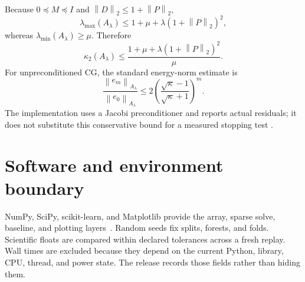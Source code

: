 \documentclass[10pt,letterpaper,twoside]{article}
\newcommand{\norm}[1]{\left\lVert #1\right\rVert}
\begin{document}
Because $0\preceq M\preceq I$ and
$\norm{D}_2\le1+\norm{P}_2$,
\begin{equation}
 \lambda_{\max}(A_\lambda)
 \le1+\mu+\lambda(1+\norm{P}_2)^2,
\end{equation}
whereas $\lambda_{\min}(A_\lambda)\ge\mu$.  Therefore
\begin{equation}
 \kappa_2(A_\lambda)\le
 \frac{1+\mu+\lambda(1+\norm{P}_2)^2}{\mu}.
\end{equation}
For unpreconditioned CG, the standard energy-norm estimate is
\begin{equation}
 \frac{\norm{e_m}_{A_\lambda}}{\norm{e_0}_{A_\lambda}}
 \le2\left(\frac{\sqrt\kappa-1}{\sqrt\kappa+1}\right)^m.
\end{equation}
The implementation uses a Jacobi preconditioner and reports actual residuals;
it does not substitute this conservative bound for a measured stopping test
\cite{hestenes1952methods,saad2003iterative,benzi2002preconditioning}.

\section{Software and environment boundary}

NumPy, SciPy, scikit-learn, and Matplotlib provide the array, sparse solve,
baseline, and plotting layers~\cite{harris2020array,virtanen2020scipy,
pedregosa2011scikit}.  Random seeds fix splits, forests, and folds.  Scientific
floats are compared within declared tolerances across a fresh replay.  Wall
times are excluded because they depend on the current Python, library, CPU,
thread, and power state.  The release records those fields rather than hiding
them.



\end{document}
